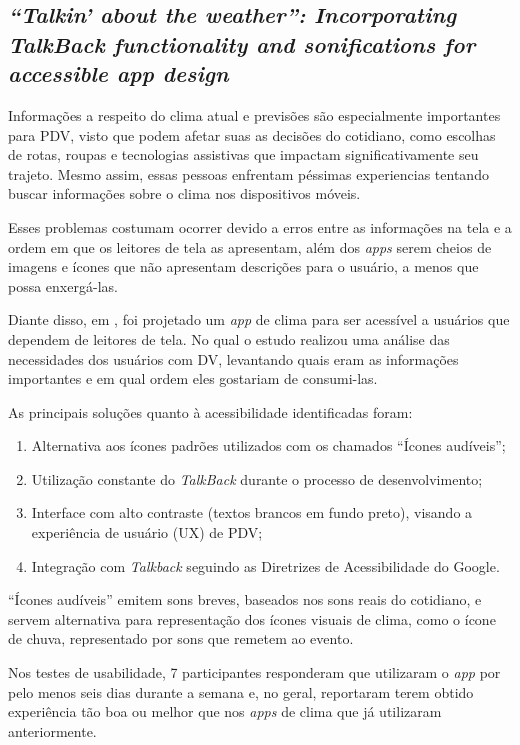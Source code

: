 \subsection{\emph{``Talkin' about the weather'': Incorporating TalkBack functionality and sonifications for accessible app design}}

Informações a respeito do clima atual e previsões são especialmente importantes para PDV, visto que podem afetar suas as decisões
do cotidiano, como escolhas de rotas, roupas e tecnologias assistivas que impactam significativamente seu trajeto.
Mesmo assim, essas pessoas enfrentam péssimas experiencias tentando buscar informações sobre o clima nos dispositivos móveis.

Esses problemas costumam ocorrer devido a erros entre as informações na tela e a ordem em que os leitores de tela as apresentam, além dos
\emph{apps} serem cheios de imagens e ícones que não apresentam descrições para o usuário, a menos que possa enxergá-las.

Diante disso, em , foi projetado um \emph{app} de clima para ser acessível a usuários que dependem
de leitores de tela. No qual o estudo realizou uma análise das necessidades dos usuários com DV, levantando quais eram as informações
importantes e em qual ordem eles gostariam de consumi-las.

As principais soluções quanto à acessibilidade identificadas foram:

\begin{enumerate}
  \item Alternativa aos ícones padrões utilizados com os chamados ``Ícones audíveis'';
  \item Utilização constante do \emph{TalkBack} durante o processo de desenvolvimento;
  \item Interface com alto contraste (textos brancos em fundo preto), visando a experiência de usuário (UX) de PDV\@;
  \item Integração com \emph{Talkback} seguindo as Diretrizes de Acessibilidade do Google.
\end{enumerate}

``Ícones audíveis'' emitem sons breves, baseados nos sons reais do cotidiano, e servem alternativa para representação dos ícones
visuais de clima, como o ícone de chuva, representado por sons que remetem ao evento.

Nos testes de usabilidade, 7 participantes responderam que utilizaram o \emph{app} por pelo menos seis dias durante a semana
e, no geral, reportaram terem obtido experiência tão boa ou melhor que nos \emph{apps} de clima que já utilizaram anteriormente.

